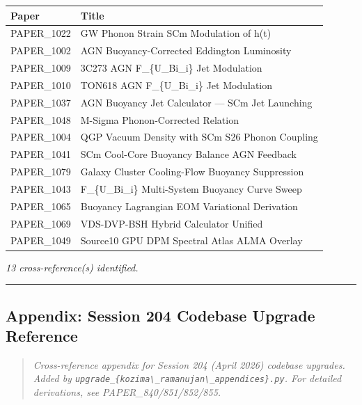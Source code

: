 {\def\LTcaptype{none} %
\begin{longtable}[]{@{}ll@{}}
\toprule\noalign{}
Paper & Title \\
\midrule\noalign{}
\endhead
\bottomrule\noalign{}
\endlastfoot
PAPER\_1022 & GW Phonon Strain SCm Modulation of h(t) \\
PAPER\_1002 & AGN Buoyancy-Corrected Eddington Luminosity \\
PAPER\_1009 & 3C273 AGN F\_\{U\_Bi\_i\} Jet Modulation \\
PAPER\_1010 & TON618 AGN F\_\{U\_Bi\_i\} Jet Modulation \\
PAPER\_1037 & AGN Buoyancy Jet Calculator --- SCm Jet Launching \\
PAPER\_1048 & M-Sigma Phonon-Corrected Relation \\
PAPER\_1004 & QGP Vacuum Density with SCm S26 Phonon Coupling \\
PAPER\_1041 & SCm Cool-Core Buoyancy Balance AGN Feedback \\
PAPER\_1079 & Galaxy Cluster Cooling-Flow Buoyancy Suppression \\
PAPER\_1043 & F\_\{U\_Bi\_i\} Multi-System Buoyancy Curve Sweep \\
PAPER\_1065 & Buoyancy Lagrangian EOM Variational Derivation \\
PAPER\_1069 & VDS-DVP-BSH Hybrid Calculator Unified \\
PAPER\_1049 & Source10 GPU DPM Spectral Atlas ALMA Overlay \\
\end{longtable}
}

\emph{13 cross-reference(s) identified.}

\begin{center}\rule{0.5\linewidth}{0.5pt}\end{center}

\subsection{Appendix: Session 204 Codebase Upgrade
Reference}\label{appendix-session-204-codebase-upgrade-reference}

\begin{quote}
\emph{Cross-reference appendix for Session 204 (April 2026) codebase
upgrades. Added by
\texttt{upgrade\_\{kozima\textbackslash{}\_ramanujan\textbackslash{}\_appendices\}.py}.
For detailed derivations, see PAPER\_840/851/852/855.}
\end{quote}

